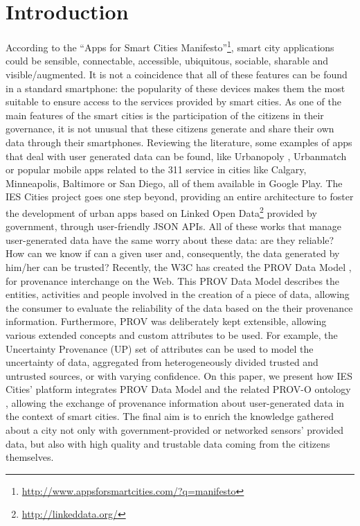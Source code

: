 \section{Introduction}
\label{sec:introduction}

According to the ``Apps for Smart Cities Manifesto''\footnote{\url{http://www.appsforsmartcities.com/?q=manifesto}}, smart city applications could be sensible, connectable, accessible, ubiquitous, sociable, sharable and visible/augmented. It is not a coincidence that all of these features can be found in a standard smartphone: the popularity of these devices makes them the most suitable to ensure access to the services provided by smart cities. As one of the main features of the smart cities is the participation of the citizens in their governance, it is not unusual that these citizens generate and share their own data through their smartphones. Reviewing the literature, some examples of apps that deal with user generated data can be found, like Urbanopoly \cite{celino_urbanopoly_2012}, Urbanmatch \cite{celino_urbanmatch_2012} or popular mobile apps related to the 311 service in cities like Calgary, Minneapolis, Baltimore or San Diego, all of them available in Google Play. The IES Cities project goes one step beyond, providing an entire architecture to foster the development of urban apps based on Linked Open Data\footnote{\url{http://linkeddata.org/}} provided by government, through user-friendly JSON APIs. All of these works that manage user-generated data have the same worry about these data: are they reliable? How can we know if can a given user and, consequently, the data generated by him/her can be trusted? Recently, the W3C has created the PROV Data Model \cite{moreau_prov-dm:_2012}, for provenance interchange on the Web. This PROV Data Model describes the entities, activities and people involved in the creation of a piece of data, allowing the consumer to evaluate the reliability of the data based on the their provenance information. Furthermore, PROV was deliberately kept extensible, allowing various extended concepts and custom attributes to be used. For example, the Uncertainty Provenance (UP) \cite{de_nies_modeling_2013} set of attributes can be used to model the uncertainty of data, aggregated from heterogeneously divided trusted and untrusted sources, or with varying confidence. On this paper, we present how IES Cities' platform integrates PROV Data Model and the related PROV-O ontology \cite{lebo_prov-o:_2013}, allowing the exchange of provenance information about user-generated data in the context of smart cities. The final aim is to enrich the knowledge gathered about a city not only with government-provided or networked sensors’ provided data, but also with high quality and trustable data coming from the citizens themselves.

